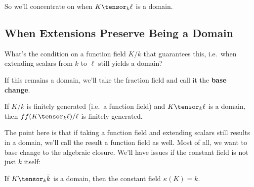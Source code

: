 So we'll concentrate on when \(K \tensor_k \ell\) is a domain.

\hypertarget{when-extensions-preserve-being-a-domain}{%
\subsection{When Extensions Preserve Being a
Domain}\label{when-extensions-preserve-being-a-domain}}

\begin{question}

What's the condition on a function field \(K/k\) that guarantees this,
i.e.~when extending scalars from \(k\) to \(\ell\) still yields a
domain?

\end{question}

\begin{definition}

If this remains a domain, we'll take the fraction field and call it the
\textbf{base change}.

\end{definition}

\begin{exercise}

If \(K/k\) is finitely generated (i.e.~a function field) and
\(K\tensor_k \ell\) is a domain, then \(ff(K\tensor_k \ell)/\ell\) is
finitely generated.

\end{exercise}

\begin{remark}

The point here is that if taking a function field and extending scalars
still results in a domain, we'll call the result a function field as
well. Most of all, we want to base change to the algebraic closure.
We'll have issues if the constant field is not just \(k\) itself:

\end{remark}

\begin{lemma}

If \(K\tensor_k \bar k\) is a domain, then the constant field
\(\kappa(K) = k\).

\end{lemma}


